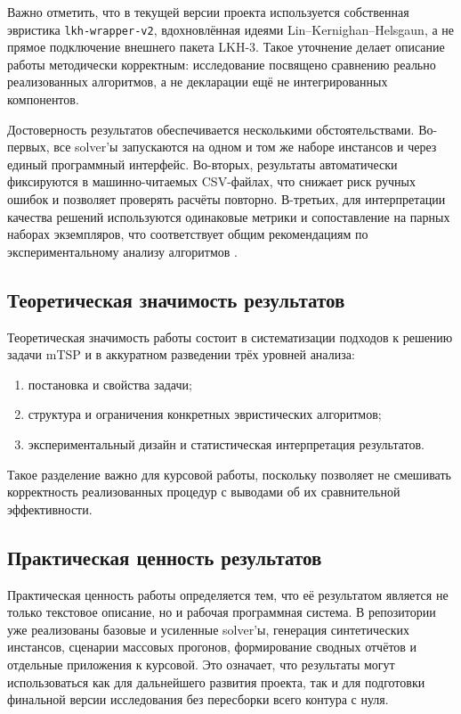 \documentclass[a4paper,12pt]{article}
\begin{document}
Важно отметить, что в текущей версии проекта используется собственная эвристика \texttt{lkh-wrapper-v2}, вдохновлённая идеями Lin--Kernighan--Helsgaun, а не прямое подключение внешнего пакета LKH-3. Такое уточнение делает описание работы методически корректным: исследование посвящено сравнению реально реализованных алгоритмов, а не декларации ещё не интегрированных компонентов.

Достоверность результатов обеспечивается несколькими обстоятельствами. Во-первых, все solver'ы запускаются на одном и том же наборе инстансов и через единый программный интерфейс. Во-вторых, результаты автоматически фиксируются в машинно-читаемых CSV-файлах, что снижает риск ручных ошибок и позволяет проверять расчёты повторно. В-третьих, для интерпретации качества решений используются одинаковые метрики и сопоставление на парных наборах экземпляров, что соответствует общим рекомендациям по экспериментальному анализу алгоритмов \cite{hooker1995,johnson1999}.

\subsection{Теоретическая значимость результатов}

Теоретическая значимость работы состоит в систематизации подходов к решению задачи mTSP и в аккуратном разведении трёх уровней анализа:
\begin{enumerate}[label=\arabic*.]
  \item постановка и свойства задачи;
  \item структура и ограничения конкретных эвристических алгоритмов;
  \item экспериментальный дизайн и статистическая интерпретация результатов.
\end{enumerate}

Такое разделение важно для курсовой работы, поскольку позволяет не смешивать корректность реализованных процедур с выводами об их сравнительной эффективности.

\subsection{Практическая ценность результатов}

Практическая ценность работы определяется тем, что её результатом является не только текстовое описание, но и рабочая программная система. В репозитории уже реализованы базовые и усиленные solver'ы, генерация синтетических инстансов, сценарии массовых прогонов, формирование сводных отчётов и отдельные приложения к курсовой. Это означает, что результаты могут использоваться как для дальнейшего развития проекта, так и для подготовки финальной версии исследования без пересборки всего контура с нуля.
\end{document}
